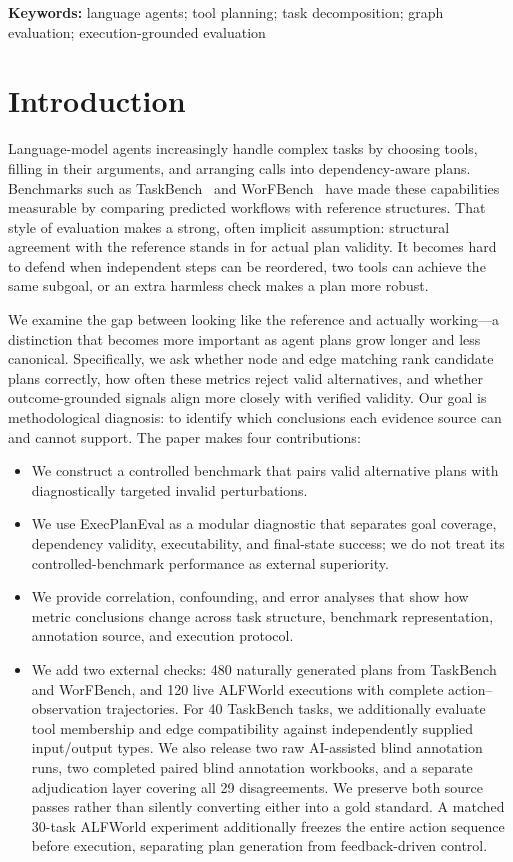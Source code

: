 \documentclass[10pt]{article}
\begin{document}
\noindent\textbf{Keywords:} language agents; tool planning; task
decomposition; graph evaluation; execution-grounded evaluation

\section{Introduction}
Language-model agents increasingly handle complex tasks by choosing tools,
filling in their arguments, and arranging calls into dependency-aware plans.
Benchmarks such as TaskBench~\cite{shen2024taskbench} and
WorFBench~\cite{qiao2025worfbench} have made these capabilities measurable by
comparing predicted workflows with reference structures.
That style of evaluation makes a strong, often implicit assumption: structural
agreement with the reference stands in for actual plan validity. It becomes
hard to defend when independent steps can be reordered, two tools can achieve
the same subgoal, or an extra harmless check makes a plan more robust.

We examine the gap between looking like the reference and actually working---a
distinction that becomes more important as agent plans grow longer and less
canonical. Specifically, we ask whether node and edge matching rank candidate
plans correctly, how often these metrics reject valid alternatives, and
whether outcome-grounded signals align more closely with verified validity.
Our goal is methodological diagnosis: to identify which conclusions each
evidence source can and cannot support. The paper makes four contributions:

\begin{itemize}
  \item We construct a controlled benchmark that pairs valid alternative plans
  with diagnostically targeted invalid perturbations.
  \item We use ExecPlanEval as a modular diagnostic that separates goal
  coverage, dependency validity, executability, and final-state success; we do
  not treat its controlled-benchmark performance as external superiority.
  \item We provide correlation, confounding, and error analyses that show how
  metric conclusions change across task structure, benchmark representation,
  annotation source, and execution protocol.
  \item We add two external checks: 480 naturally generated plans from
  TaskBench and WorFBench, and 120 live ALFWorld executions with complete
  action--observation trajectories. For 40 TaskBench tasks, we additionally
  evaluate tool membership and edge compatibility against independently
  supplied input/output types. We also release two raw AI-assisted blind
  annotation runs, two completed paired blind annotation workbooks, and a
  separate adjudication layer covering all 29 disagreements. We preserve both
  source passes rather than silently converting either into a gold standard.
  A matched 30-task ALFWorld experiment additionally freezes the entire action
  sequence before execution, separating plan generation from feedback-driven
  control.
\end{itemize}
\end{document}
